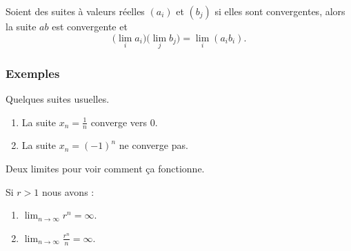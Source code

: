 \begin{proposition}     \label{PROPooIQOAooJPMoDD}
    Soient des suites à valeurs réelles \( (a_i)\) et \( (b_j)\) si elles sont convergentes, alors la suite \( ab\) est convergente et
    \begin{equation}
        \big( \lim_ia_i \big)\big( \lim_jb_j \big)=\lim_i(a_ib_i).
    \end{equation}
\end{proposition}
 
\subsubsection{Exemples}

\begin{example}
	Quelques suites usuelles.
	\begin{enumerate}
		\item
			La suite $x_n=\frac{1}{ n }$ converge vers $0$.
		\item
			La suite $x_n=(-1)^n$ ne converge pas.
	\end{enumerate}
\end{example}

Deux limites pour voir comment ça fonctionne.
\begin{lemma}
    Si \( r>1\) nous avons :
    \begin{enumerate}
        \item
            \( \lim_{n\to \infty} r^n=\infty\).
        \item
            \( \lim_{n\to \infty} \frac{ r^n }{ n }=\infty\).
    \end{enumerate}
\end{lemma}

